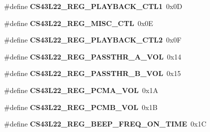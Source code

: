 \begin{DoxyCompactItemize}
\item 
\mbox{\label{group___c_s43_l22___exported___constants_ga56cb0ed5b5b693a22369a24aae3994a7}} 
\#define {\bfseries C\+S43\+L22\+\_\+\+R\+E\+G\+\_\+\+P\+L\+A\+Y\+B\+A\+C\+K\+\_\+\+C\+T\+L1}~0x0D
\item 
\mbox{\label{group___c_s43_l22___exported___constants_ga42e6c6fec6f569a7ca88afef6a8ea70b}} 
\#define {\bfseries C\+S43\+L22\+\_\+\+R\+E\+G\+\_\+\+M\+I\+S\+C\+\_\+\+C\+TL}~0x0E
\item 
\mbox{\label{group___c_s43_l22___exported___constants_ga68c645c454609b5825f891bcae87c197}} 
\#define {\bfseries C\+S43\+L22\+\_\+\+R\+E\+G\+\_\+\+P\+L\+A\+Y\+B\+A\+C\+K\+\_\+\+C\+T\+L2}~0x0F
\item 
\mbox{\label{group___c_s43_l22___exported___constants_gaf79932131a27554be319a5a70dc87b43}} 
\#define {\bfseries C\+S43\+L22\+\_\+\+R\+E\+G\+\_\+\+P\+A\+S\+S\+T\+H\+R\+\_\+\+A\+\_\+\+V\+OL}~0x14
\item 
\mbox{\label{group___c_s43_l22___exported___constants_ga09ec526b44cf628cdb978c32f918ee62}} 
\#define {\bfseries C\+S43\+L22\+\_\+\+R\+E\+G\+\_\+\+P\+A\+S\+S\+T\+H\+R\+\_\+\+B\+\_\+\+V\+OL}~0x15
\item 
\mbox{\label{group___c_s43_l22___exported___constants_ga73b637ccefd83d4bf2eabebf1c358134}} 
\#define {\bfseries C\+S43\+L22\+\_\+\+R\+E\+G\+\_\+\+P\+C\+M\+A\+\_\+\+V\+OL}~0x1A
\item 
\mbox{\label{group___c_s43_l22___exported___constants_ga160522e874afdba7d3a654951cc77c5a}} 
\#define {\bfseries C\+S43\+L22\+\_\+\+R\+E\+G\+\_\+\+P\+C\+M\+B\+\_\+\+V\+OL}~0x1B
\item 
\mbox{\label{group___c_s43_l22___exported___constants_ga469832fe381c72b76db1c573f231b3dd}} 
\#define {\bfseries C\+S43\+L22\+\_\+\+R\+E\+G\+\_\+\+B\+E\+E\+P\+\_\+\+F\+R\+E\+Q\+\_\+\+O\+N\+\_\+\+T\+I\+ME}~0x1C
\item 

\end{DoxyCompactItemize}
